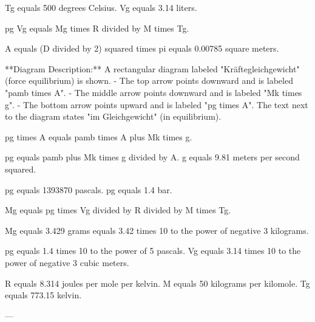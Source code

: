 Tg equals 500 degrees Celsius.  
Vg equals 3.14 liters.  

pg Vg equals Mg times R divided by M times Tg.  

A equals (D divided by 2) squared times pi equals 0.00785 square meters.  

**Diagram Description:**  
A rectangular diagram labeled "Kräftegleichgewicht" (force equilibrium) is shown.  
- The top arrow points downward and is labeled "pamb times A".  
- The middle arrow points downward and is labeled "Mk times g".  
- The bottom arrow points upward and is labeled "pg times A".  
The text next to the diagram states "im Gleichgewicht" (in equilibrium).  

pg times A equals pamb times A plus Mk times g.  

pg equals pamb plus Mk times g divided by A.  
g equals 9.81 meters per second squared.  

pg equals 1393870 pascals.  
pg equals 1.4 bar.  

Mg equals pg times Vg divided by R divided by M times Tg.  

Mg equals 3.429 grams equals 3.42 times 10 to the power of negative 3 kilograms.  

pg equals 1.4 times 10 to the power of 5 pascals.  
Vg equals 3.14 times 10 to the power of negative 3 cubic meters.  

R equals 8.314 joules per mole per kelvin.  
M equals 50 kilograms per kilomole.  
Tg equals 773.15 kelvin.  

---